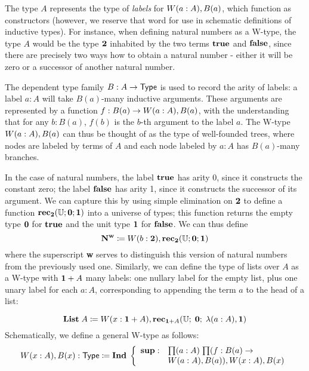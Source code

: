 The type $A$ represents the type of \emph{labels} for $W(a :A), B(a)$, which function as constructors (however, we reserve that word for use in schematic definitions of inductive types). For instance, when defining natural numbers as a W-type, the type $A$ would be the type $\mathbf{2}$ inhabited by the two terms $\mathbf{true}$ and $\mathbf{false}$, since there are precisely two ways how to obtain a natural number - either it will be zero or a successor of another natural number. 

The dependent type family $B : A \to \mathsf{Type}$ is used to record the arity of labels: a label $a : A$ will take $B(a)$-many inductive arguments. These arguments are represented by a function $f : B(a) \to W(a :A), B(a)$, with the understanding that for any $b : B(a)$, $f(b)$ is the $b$-th argument to the label $a$. The W-type $W(a :A), B(a)$ can thus be thought of as the type of well-founded trees, where nodes are labeled by terms of $A$ and each node labeled by $a : A$ has $B(a)$-many branches.

In the case of natural numbers, the label $\mathbf{true} $ has arity 0, since it constructs the constant zero; the label $\mathbf{false}$ has arity 1, since it constructs the successor of its argument. We can capture this by using simple elimination on $\mathbf{2}$ to define a function $\mathbf{rec}_\mathbf{2}(\mathbb{U};\mathbf{0};\mathbf{1})$ into a universe of types; this function returns the empty type $\mathbf{0}$ for $\mathbf{true}$ and the unit type $\mathbf{1}$ for $\mathbf{false}$. We can thus define
\[ \mathbf{N^w} \coloneqq W(b:\mathbf{2}), \mathbf{rec}_\mathbf{2}(\mathbb{U};\mathbf{0};\mathbf{1}) \]
where the superscript \textbf{w} serves to distinguish this version of natural numbers from the previously used one.
Similarly, we can define the type of lists over $A$ as a W-type with $\mathbf{1} + A$ many labels: one nullary label for the empty list, plus one unary label for each $a : A$, corresponding to appending the term $a$ to the head of a list:

\[ \mathbf{List} \; A \coloneqq W(x:\mathbf{1} + A), \mathbf{rec}_{\mathbf{1} + A}(\mathbb{U}; \; \mathbf{0}; \; \lambda{(a:A)}, \mathbf{1}) \]
Schematically, we define a general W-type as follows:
\[ \wtype{x:A} B(x) : \type \defeq \ind \left\{
\begin{array}{ll}
\supp : & \prd{a:A}{f : B(a) \to \\ & \wtype{a:A} B(a)}  \wtype{x:A} B(x)
\end{array}
\right. \]

